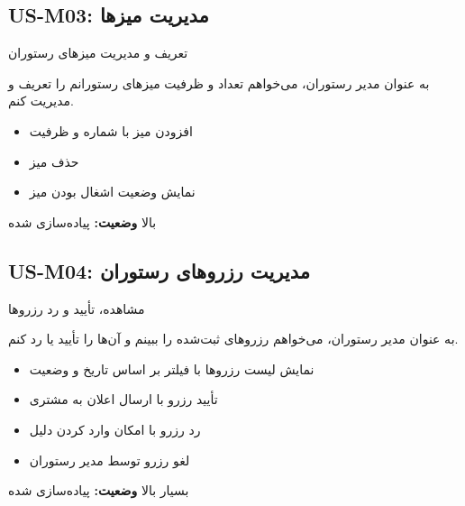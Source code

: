 \documentclass[12pt, a4paper]{article}
\begin{document}
\subsection{US-M03: مدیریت میزها}
\begin{description}[rightmargin=0.5cm]
  \item[عنوان:] تعریف و مدیریت میزهای رستوران
  \item[داستان:] به عنوان مدیر رستوران، می‌خواهم تعداد و ظرفیت میزهای رستورانم را
  تعریف و مدیریت کنم.
  \item[معیارهای پذیرش:]
  \begin{itemize}[rightmargin=0.5cm]
    \item افزودن میز با شماره و ظرفیت
    \item حذف میز
    \item نمایش وضعیت اشغال بودن میز
  \end{itemize}
  \item[اولویت:] بالا \quad \textbf{وضعیت:} پیاده‌سازی شده
\end{description}

\subsection{US-M04: مدیریت رزروهای رستوران}
\begin{description}[rightmargin=0.5cm]
  \item[عنوان:] مشاهده، تأیید و رد رزروها
  \item[داستان:] به عنوان مدیر رستوران، می‌خواهم رزروهای ثبت‌شده را ببینم و آن‌ها را
  تأیید یا رد کنم.
  \item[معیارهای پذیرش:]
  \begin{itemize}[rightmargin=0.5cm]
    \item نمایش لیست رزروها با فیلتر بر اساس تاریخ و وضعیت
    \item تأیید رزرو با ارسال اعلان به مشتری
    \item رد رزرو با امکان وارد کردن دلیل
    \item لغو رزرو توسط مدیر رستوران
  \end{itemize}
  \item[اولویت:] بسیار بالا \quad \textbf{وضعیت:} پیاده‌سازی شده
\end{description}
\end{document}

